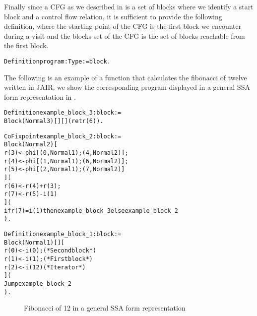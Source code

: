Finally since a CFG as we described in  is a set of blocks where we identify a start block and a control flow relation, it is sufficient to provide the following definition, where the starting point of the CFG is the first block we encounter during a visit and the blocks set of the CFG is the set of blocks reachable from the first block.

\begin{alltt}
Definition program : Type := block.
\end{alltt}

The following is an example of a function that calculates the fibonacci of twelve written in JAIR, we show the corresponding program displayed in a general SSA form representation in .

\begin{alltt}
Definition example_block_3 : block :=
  Block (Normal 3) [] [] (ret r(6)).

CoFixpoint example_block_2 : block :=
  Block (Normal 2) [
    r(3) <- phi [(0, Normal 1); (4, Normal 2)];
    r(4) <- phi [(1, Normal 1); (6, Normal 2)];
    r(5) <- phi [(2, Normal 1); (7, Normal 2)]
  ] [
    r(6) <- r(4) + r(3);
    r(7) <- r(5) - i(1)
  ] (
    if r(7) = i(1) then example_block_3 else example_block_2
  ).

Definition example_block_1 : block :=
  Block (Normal 1) [] [
    r(0) <- i(0);  (* Second block *)
    r(1) <- i(1);  (* First block *)
    r(2) <- i(12)  (* Iterator*)
  ] (
    Jump example_block_2
  ).
\end{alltt}

\begin{figure}[ht]
    \centering
    \caption{Fibonacci of 12 in a general SSA form representation}
    \label{fig:example-jair}
\end{figure}

